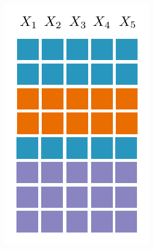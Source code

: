 \documentclass[final]{beamer}
\begin{document}
\begin{frame}{}
\begin{textblock}{80}
\begin{minipage}[t]{4.986cm}
      \includegraphics[width=\linewidth]{figures/grid-1}
    \end{minipage}\hspace{30pt}
\end{textblock}
\end{frame}
\end{document}
